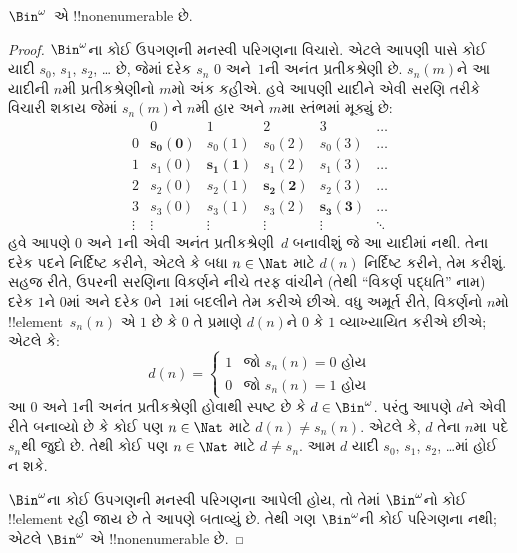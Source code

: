 \documentclass[../../../include/open-logic-section]{subfiles}
\begin{document}
\begin{thm}
$\Bin^\omega$~એ !!{nonenumerable} છે.
\end{thm}

\begin{proof}
$\Bin^\omega$ના કોઈ ઉપગણની મનસ્વી પરિગણના વિચારો. એટલે આપણી પાસે
કોઈ યાદી $s_{0}$, $s_{1}$, $s_{2}$, \dots{} છે, જેમાં દરેક $s_n$
$0$ અને~$1$ની અનંત પ્રતીકશ્રેણી છે. $s_n(m)$ને આ યાદીની $n$મી
પ્રતીકશ્રેણીનો $m$મો અંક કહીએ. હવે આપણી યાદીને એવી સરણિ તરીકે
વિચારી શકાય જેમાં $s_n(m)$ને $n$મી હાર અને $m$મા સ્તંભમાં મૂક્યું છે:
\[
\begin{array}{c|c|c|c|c|c}
& 0 & 1 & 2 & 3 & \dots \\\hline
0 & \mathbf{s_{0}(0)} & s_{0}(1) & s_{0}(2) & s_0(3) & \dots \\\hline
1 & s_{1}(0)& \mathbf{s_{1}(1)} & s_1(2) & s_1(3) & \dots \\\hline
2 & s_{2}(0)& s_{2}(1) & \mathbf{s_2(2)} & s_2(3) & \dots \\\hline
3 & s_{3}(0)& s_{3}(1) & s_3(2) & \mathbf{s_3(3)} & \dots \\\hline
\vdots & \vdots & \vdots & \vdots & \vdots & \mathbf{\ddots}
\end{array}
\]
હવે આપણે $0$ અને $1$ની એવી અનંત પ્રતીકશ્રેણી~$d$ બનાવીશું જે આ
યાદીમાં નથી. તેના દરેક પદને નિર્દિષ્ટ કરીને, એટલે કે બધા
$n \in \Nat$ માટે $d(n)$ નિર્દિષ્ટ કરીને, તેમ કરીશું. સહજ રીતે,
ઉપરની સરણિના વિકર્ણને નીચે તરફ વાંચીને (તેથી “વિકર્ણ પદ્ધતિ” નામ)
દરેક $1$ને $0$માં અને દરેક $0$ને~$1$માં બદલીને તેમ કરીએ છીએ.
વધુ અમૂર્ત રીતે, વિકર્ણનો $n$મો !!{element}~$s_n(n)$ એ $1$ છે કે
$0$ તે પ્રમાણે $d(n)$ને $0$ કે $1$ વ્યાખ્યાયિત કરીએ છીએ; એટલે કે:
\[
d(n) =
\begin{cases}
1 & \text{જો $s_{n}(n) = 0$ હોય}\\
0 & \text{જો $s_{n}(n) = 1$ હોય}
\end{cases}
\]
આ $0$ અને $1$ની અનંત પ્રતીકશ્રેણી હોવાથી સ્પષ્ટ છે કે
$d \in \Bin^\omega$. પરંતુ આપણે $d$ને એવી રીતે બનાવ્યો છે કે
કોઈ પણ $n \in \Nat$ માટે $d(n) \neq s_n(n)$. એટલે કે, $d$ તેના
$n$મા પદે $s_n$થી જુદો છે. તેથી કોઈ પણ $n\in \Nat$ માટે
$d \neq s_n$. આમ $d$ યાદી $s_0$, $s_1$, $s_2$, \dots{}માં હોઈ ન શકે.

$\Bin^\omega$ના કોઈ ઉપગણની મનસ્વી પરિગણના આપેલી હોય, તો તેમાં
$\Bin^\omega$નો કોઈ !!{element} રહી જાય છે તે આપણે બતાવ્યું છે.
તેથી ગણ $\Bin^\omega$ની કોઈ પરિગણના નથી; એટલે $\Bin^\omega$ એ
!!{nonenumerable} છે.
\end{proof}
\end{document}
